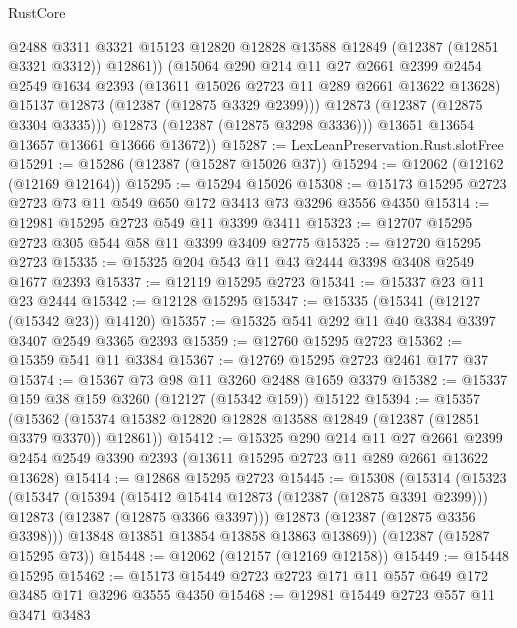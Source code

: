 \begin{lexlean}{RustCore}
\begin{coremodule}
                @2488
                @3311
                @3321
                @15123
                @12820
                @12828
                @13588
                @12849
                (@12387 (@12851 @3321 @3312))
                @12861))
            (@15064
              @290
              @214
              @11
              @27
              @2661
              @2399
              @2454
              @2549
              @1634
              @2393
              (@13611 @15026 @2723 @11 @289 @2661 @13622 @13628)
              @15137
              @12873
              (@12387 (@12875 @3329 @2399)))
            @12873
            (@12387 (@12875 @3304 @3335)))
          @12873
          (@12387 (@12875 @3298 @3336)))
        @13651
        @13654
        @13657
        @13661
        @13666
        @13672))
@15287 := LexLeanPreservation.Rust.slotFree
@15291 := @15286 (@12387 (@15287 @15026 @37))
@15294 := @12062 (@12162 (@12169 @12164))
@15295 := @15294 @15026
@15308 := @15173 @15295 @2723 @2723 @73 @11 @549 @650 @172 @3413 @73 @3296 @3556 @4350
@15314 := @12981 @15295 @2723 @549 @11 @3399 @3411
@15323 := @12707 @15295 @2723 @305 @544 @58 @11 @3399 @3409 @2775
@15325 := @12720 @15295 @2723
@15335 := @15325 @204 @543 @11 @43 @2444 @3398 @3408 @2549 @1677 @2393
@15337 := @12119 @15295 @2723
@15341 := @15337 @23 @11 @23 @2444
@15342 := @12128 @15295
@15347 := @15335 (@15341 (@12127 (@15342 @23)) @14120)
@15357 := @15325 @541 @292 @11 @40 @3384 @3397 @3407 @2549 @3365 @2393
@15359 := @12760 @15295 @2723
@15362 := @15359 @541 @11 @3384
@15367 := @12769 @15295 @2723 @2461 @177 @37
@15374 := @15367 @73 @98 @11 @3260 @2488 @1659 @3379
@15382 := @15337 @159 @38 @159 @3260 (@12127 (@15342 @159)) @15122
@15394 := @15357
    (@15362 (@15374 @15382 @12820 @12828 @13588 @12849 (@12387 (@12851 @3379 @3370)) @12861))
@15412 := @15325
    @290
    @214
    @11
    @27
    @2661
    @2399
    @2454
    @2549
    @3390
    @2393
    (@13611 @15295 @2723 @11 @289 @2661 @13622 @13628)
@15414 := @12868 @15295 @2723
@15445 := @15308
    (@15314
      (@15323
        (@15347
          (@15394
            (@15412 @15414 @12873 (@12387 (@12875 @3391 @2399)))
            @12873
            (@12387 (@12875 @3366 @3397)))
          @12873
          (@12387 (@12875 @3356 @3398)))
        @13848
        @13851
        @13854
        @13858
        @13863
        @13869))
    (@12387 (@15287 @15295 @73))
@15448 := @12062 (@12157 (@12169 @12158))
@15449 := @15448 @15295
@15462 := @15173 @15449 @2723 @2723 @171 @11 @557 @649 @172 @3485 @171 @3296 @3555 @4350
@15468 := @12981 @15449 @2723 @557 @11 @3471 @3483

\end{coremodule}
\end{lexlean}
